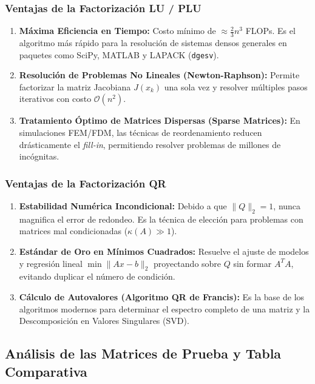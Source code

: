 \documentclass[11pt,a4paper]{article}
\theoremstyle{definition}
\theoremstyle{remark}
\begin{document}
\subsubsection{Ventajas de la Factorización LU / PLU}
\begin{enumerate}[leftmargin=*]
    \item \textbf{Máxima Eficiencia en Tiempo:} Costo mínimo de $\approx \frac{2}{3}n^3$ FLOPs. Es el algoritmo más rápido para la resolución de sistemas densos generales en paquetes como SciPy, MATLAB y LAPACK (\texttt{dgesv}).
    \item \textbf{Resolución de Problemas No Lineales (Newton-Raphson):} Permite factorizar la matriz Jacobiana $J(x_k)$ una sola vez y resolver múltiples pasos iterativos con costo $\mathcal{O}(n^2)$.
    \item \textbf{Tratamiento Óptimo de Matrices Dispersas (Sparse Matrices):} En simulaciones FEM/FDM, las técnicas de reordenamiento reducen drásticamente el \textit{fill-in}, permitiendo resolver problemas de millones de incógnitas.
\end{enumerate}

\subsubsection{Ventajas de la Factorización QR}
\begin{enumerate}[leftmargin=*]
    \item \textbf{Estabilidad Numérica Incondicional:} Debido a que $\|Q\|_2 = 1$, nunca magnifica el error de redondeo. Es la técnica de elección para problemas con matrices mal condicionadas ($\kappa(A) \gg 1$).
    \item \textbf{Estándar de Oro en Mínimos Cuadrados:} Resuelve el ajuste de modelos y regresión lineal $\min \|Ax - b\|_2$ proyectando sobre $Q$ sin formar $A^T A$, evitando duplicar el número de condición.
    \item \textbf{Cálculo de Autovalores (Algoritmo QR de Francis):} Es la base de los algoritmos modernos para determinar el espectro completo de una matriz y la Descomposición en Valores Singulares (SVD).
\end{enumerate}

\subsection{Análisis de las Matrices de Prueba y Tabla Comparativa}
\end{document}
